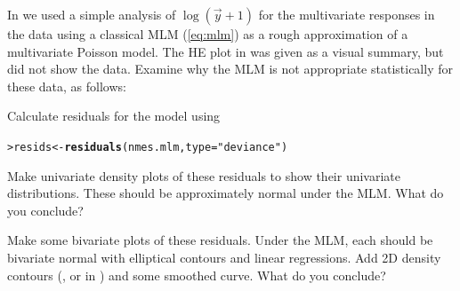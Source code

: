 \documentclass[11pt]{report}\usepackage[]{graphicx}\usepackage[]{color}
\makeatletter
\newcommand{\hlstr}[1]{\textcolor[rgb]{0.192,0.494,0.8}{#1}}%
\newcommand{\hlstd}[1]{\textcolor[rgb]{0.345,0.345,0.345}{#1}}%
\newcommand{\hlkwb}[1]{\textcolor[rgb]{0.69,0.353,0.396}{#1}}%
\newcommand{\hlkwc}[1]{\textcolor[rgb]{0.333,0.667,0.333}{#1}}%
\newcommand{\hlkwd}[1]{\textcolor[rgb]{0.737,0.353,0.396}{\textbf{#1}}}%
\newenvironment{kframe}{%
 \def\at@end@of@kframe{}%
 \ifinner\ifhmode%
  \def\at@end@of@kframe{\end{minipage}}%
  \begin{minipage}{\columnwidth}%
 \fi\fi%
 \def\FrameCommand##1{\hskip\@totalleftmargin \hskip-\fboxsep
 \colorbox{shadecolor}{##1}\hskip-\fboxsep
     \hskip-\linewidth \hskip-\@totalleftmargin \hskip\columnwidth}%
 \MakeFramed {\advance\hsize-\width
   \@totalleftmargin\z@ \linewidth\hsize
   \@setminipage}}%
 {\par\unskip\endMakeFramed%
 \at@end@of@kframe}
\newenvironment{knitrout}{}{} %
\renewenvironment{knitrout}{\small\renewcommand{\baselinestretch}{.85}}{} %
\makeatother
\begin{document}
\begin{Exercises}
  \exercise In  we used a simple analysis of $\log(\vec{y}+1)$ for the multivariate responses
  in the  data using a classical MLM (\eqref{eq:mlm})
  as a rough approximation of a multivariate Poisson model.
  The HE plot in  was given as a visual summary, but did not show the data.
  Examine why the MLM is not appropriate statistically for these data, as follows:
  \begin{enumerate*}
    \item Calculate residuals for the model  using
\begin{knitrout}
\color{fgcolor}\begin{kframe}
\begin{alltt}
\hlstd{> }\hlstd{resids} \hlkwb{<-} \hlkwd{residuals}\hlstd{(nmes.mlm,} \hlkwc{type}\hlstd{=}\hlstr{"deviance"}\hlstd{)}
\end{alltt}
\end{kframe}
\end{knitrout}
    \item Make univariate density plots of these residuals to show their univariate distributions.
    These should be approximately normal under the MLM.  What do you conclude?
    \item Make some bivariate plots of these residuals. Under the MLM, each should be bivariate normal
    with elliptical contours and linear regressions. Add 2D density contours
    (, or  in ) and some smoothed curve.
     What do you conclude?

  \end{enumerate*}

\end{Exercises}

{\itemsep -2pt

}
\end{document}
